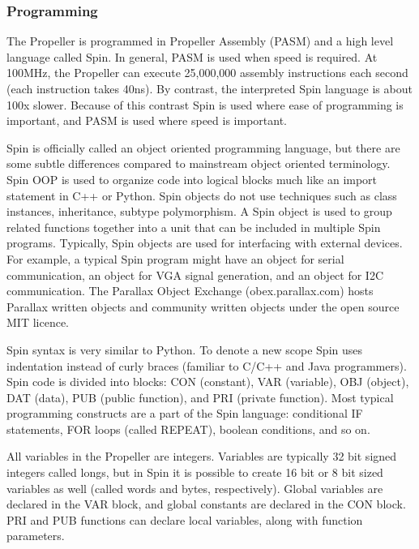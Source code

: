 \documentclass{article}
\numberwithin{equation}{section} %
\begin{document}
\subsubsection{Programming}

The Propeller is programmed in Propeller Assembly (PASM) and a high level language called Spin. In general, PASM is used when speed is required. At 100MHz, the Propeller can execute 25,000,000 assembly instructions each second (each instruction takes 40ns). By contrast, the interpreted Spin language is about 100x slower. Because of this contrast Spin is used where ease of programming is important, and PASM is used where speed is important.

Spin is officially called an object oriented programming language, but there are some subtle differences compared to mainstream object oriented terminology. Spin OOP is used to organize code into logical blocks much like an import statement in C++ or Python. Spin objects do not use techniques such as class instances, inheritance, subtype polymorphism. A Spin object is used to group related functions together into a unit that can be included in multiple Spin programs. Typically, Spin objects are used for interfacing with external devices. For example, a typical Spin program might have an object for serial communication, an object for VGA signal generation, and an object for I2C communication. The Parallax Object Exchange (obex.parallax.com) hosts Parallax written objects and community written objects under the open source MIT licence.

Spin syntax is very similar to Python. To denote a new scope Spin uses indentation instead of curly braces {} (familiar to C/C++ and Java programmers). Spin code is divided into blocks: CON (constant), VAR (variable), OBJ (object), DAT (data), PUB (public function), and PRI (private function). Most typical programming constructs are a part of the Spin language: conditional IF statements, FOR loops (called REPEAT), boolean conditions, and so on.

All variables in the Propeller are integers. Variables are typically 32 bit signed integers called longs, but in Spin it is possible to create 16 bit or 8 bit sized variables as well (called words and bytes, respectively). Global variables are declared in the VAR block, and global constants are declared in the CON block. PRI and PUB functions can declare local variables, along with function parameters. 
\end{document}
